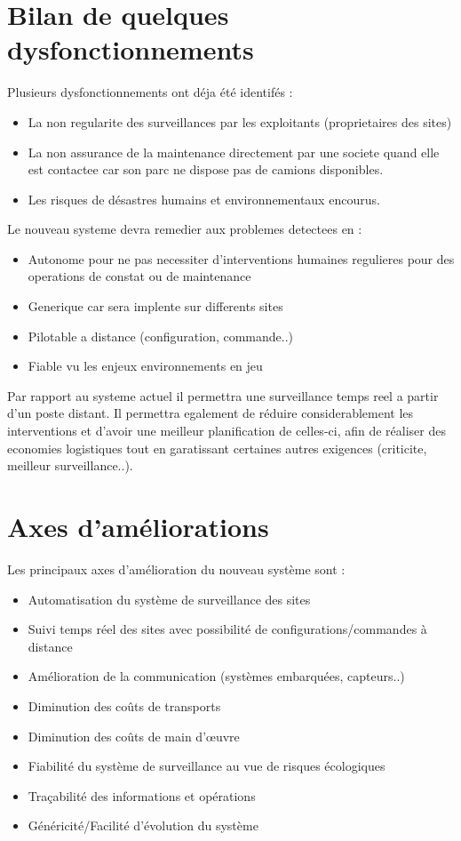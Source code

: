 \section {Bilan de quelques dysfonctionnements}
Plusieurs dysfonctionnements ont déja été identifés : 
\begin{itemize}
	\item La non regularite des surveillances par les exploitants (proprietaires des sites)
	\item La non assurance de la maintenance directement par une societe quand elle est contactee car son parc ne dispose pas de camions disponibles.
	\item Les risques de désastres humains et environnementaux encourus.
\end{itemize}
	Le nouveau systeme devra remedier aux problemes detectees en : 
\begin{itemize}
	\item Autonome pour ne pas necessiter d'interventions humaines regulieres pour des operations de constat ou de maintenance
	\item Generique car sera implente sur differents sites
	\item Pilotable a distance (configuration, commande..)
	\item Fiable vu les enjeux environnements en jeu
\end{itemize}	
	Par rapport au systeme actuel il permettra une surveillance temps reel a partir d'un poste distant. 
	Il permettra egalement de réduire considerablement les interventions et d'avoir une meilleur planification de celles-ci, afin de réaliser des economies logistiques tout en garatissant certaines autres exigences (criticite, meilleur surveillance..).


\section{Axes d'améliorations}

Les principaux axes d'amélioration du nouveau système sont :

\begin{itemize}
\item Automatisation du système de surveillance des sites
\item Suivi temps réel des sites avec possibilité de configurations/commandes à distance
\item Amélioration de la communication (systèmes embarquées, capteurs..)
\item Diminution des coûts de transports
\item Diminution des coûts de main d'œuvre
\item Fiabilité du système de surveillance au vue de risques écologiques
\item Traçabilité des informations et opérations
\item Généricité/Facilité d'évolution du système
\end{itemize}
